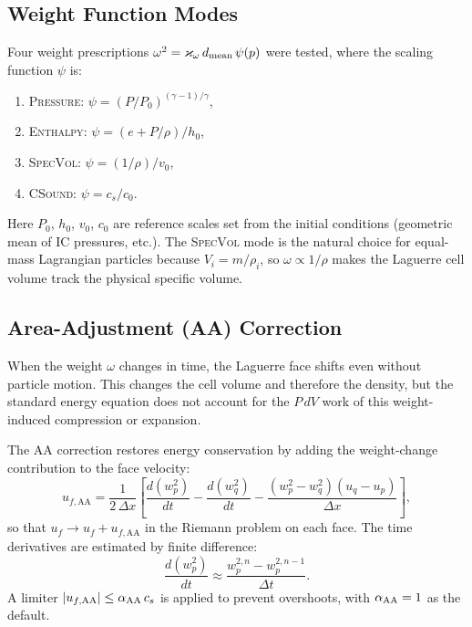 \documentclass[twocolumn]{aastex63}
\begin{document}
\subsection{Weight Function Modes}

Four weight prescriptions $\omega^2 = \varkappa_\omega \,d_{\rm mean}\,\psi(p)$
were tested, where the scaling function $\psi$ is:
\begin{enumerate}[label=(\roman*)]
  \item \textsc{Pressure}: $\psi = (P/P_0)^{(\gamma-1)/\gamma}$,
  \item \textsc{Enthalpy}: $\psi = (e + P/\rho)/h_0$,
  \item \textsc{SpecVol}: $\psi = (1/\rho)/v_0$,
  \item \textsc{CSound}: $\psi = c_s / c_0$.
\end{enumerate}
Here $P_0$, $h_0$, $v_0$, $c_0$ are reference scales set from the
initial conditions (geometric mean of IC pressures, etc.).
The \textsc{SpecVol} mode is the natural choice for equal-mass
Lagrangian particles because $V_i = m/\rho_i$, so
$\omega \propto 1/\rho$ makes the Laguerre cell volume track the
physical specific volume.

\subsection{Area-Adjustment (AA) Correction}

When the weight $\omega$ changes in time, the Laguerre face
shifts even without particle motion.  This changes the cell
volume and therefore the density, but the standard energy
equation does not account for the $P\,dV$ work of this
weight-induced compression or expansion.

The AA correction restores energy conservation by adding the
weight-change contribution to the face velocity:
\begin{equation}
  u_{f,\mathrm{AA}} = \frac{1}{2\,\Delta x}\left[
    \frac{d(w_p^2)}{dt} - \frac{d(w_q^2)}{dt}
    - \frac{(w_p^2-w_q^2)(u_q-u_p)}{\Delta x}\right],
\end{equation}
so that $u_f \to u_f + u_{f,\mathrm{AA}}$ in the Riemann problem
on each face.  The time derivatives are estimated by
finite difference:
\begin{equation}
  \frac{d(w_p^2)}{dt} \approx \frac{w_p^{2,n} - w_p^{2,n-1}}{\Delta t}.
\end{equation}
A limiter $|u_{f,\mathrm{AA}}| \le \alpha_{\rm AA}\, c_s$ is
applied to prevent overshoots, with $\alpha_{\rm AA}=1$ as the
default.
\end{document}
